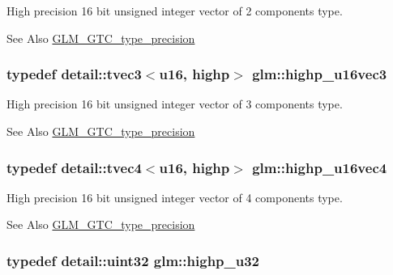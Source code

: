High precision 16 bit unsigned integer vector of 2 components type. \begin{DoxySeeAlso}{See Also}
\hyperlink{group__gtc__type__precision}{G\-L\-M\-\_\-\-G\-T\-C\-\_\-type\-\_\-precision} 
\end{DoxySeeAlso}
\hypertarget{group__gtc__type__precision_gad98b30ad9bbfb79233340be3ba53ceb6}{
\subsubsection[{highp\-\_\-u16vec3}]{\setlength{\rightskip}{0pt plus 5cm}typedef detail\-::tvec3$<$u16, highp$>$ {\bf glm\-::highp\-\_\-u16vec3}}}\label{group__gtc__type__precision_gad98b30ad9bbfb79233340be3ba53ceb6}
High precision 16 bit unsigned integer vector of 3 components type. \begin{DoxySeeAlso}{See Also}
\hyperlink{group__gtc__type__precision}{G\-L\-M\-\_\-\-G\-T\-C\-\_\-type\-\_\-precision} 
\end{DoxySeeAlso}
\hypertarget{group__gtc__type__precision_ga89074b108ec0643cffdfd008bedd3ffb}{
\subsubsection[{highp\-\_\-u16vec4}]{\setlength{\rightskip}{0pt plus 5cm}typedef detail\-::tvec4$<$u16, highp$>$ {\bf glm\-::highp\-\_\-u16vec4}}}\label{group__gtc__type__precision_ga89074b108ec0643cffdfd008bedd3ffb}
High precision 16 bit unsigned integer vector of 4 components type. \begin{DoxySeeAlso}{See Also}
\hyperlink{group__gtc__type__precision}{G\-L\-M\-\_\-\-G\-T\-C\-\_\-type\-\_\-precision} 
\end{DoxySeeAlso}
\hypertarget{group__gtc__type__precision_gae8e8a2c712653891a03c171795286ac5}{
\subsubsection[{highp\-\_\-u32}]{\setlength{\rightskip}{0pt plus 5cm}typedef detail\-::uint32 {\bf glm\-::highp\-\_\-u32}}}\label{group__gtc__type__precision_gae8e8a2c712653891a03c171795286ac5}
